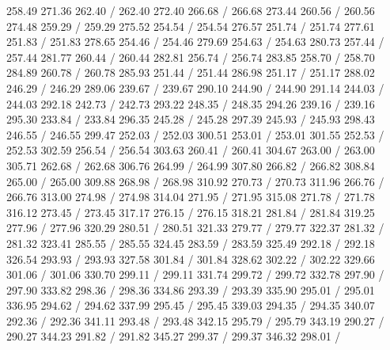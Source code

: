 { 258.49 271.36 262.40 /
 262.40 272.40 266.68 /
 266.68 273.44 260.56 /
 260.56 274.48 259.29 /
 259.29 275.52 254.54 /
 254.54 276.57 251.74 /
 251.74 277.61 251.83 /
 251.83 278.65 254.46 /
 254.46 279.69 254.63 /
 254.63 280.73 257.44 /
 257.44 281.77 260.44 /
 260.44 282.81 256.74 /
 256.74 283.85 258.70 /
 258.70 284.89 260.78 /
 260.78 285.93 251.44 /
 251.44 286.98 251.17 /
 251.17 288.02 246.29 /
 246.29 289.06 239.67 /
 239.67 290.10 244.90 /
 244.90 291.14 244.03 /
 244.03 292.18 242.73 /
 242.73 293.22 248.35 /
 248.35 294.26 239.16 /
 239.16 295.30 233.84 /
 233.84 296.35 245.28 /
 245.28 297.39 245.93 /
 245.93 298.43 246.55 /
 246.55 299.47 252.03 /
 252.03 300.51 253.01 /
 253.01 301.55 252.53 /
 252.53 302.59 256.54 /
 256.54 303.63 260.41 /
 260.41 304.67 263.00 /
 263.00 305.71 262.68 /
 262.68 306.76 264.99 /
 264.99 307.80 266.82 /
 266.82 308.84 265.00 /
 265.00 309.88 268.98 /
 268.98 310.92 270.73 /
 270.73 311.96 266.76 /
 266.76 313.00 274.98 /
 274.98 314.04 271.95 /
 271.95 315.08 271.78 /
 271.78 316.12 273.45 /
 273.45 317.17 276.15 /
 276.15 318.21 281.84 /
 281.84 319.25 277.96 /
 277.96 320.29 280.51 /
 280.51 321.33 279.77 /
 279.77 322.37 281.32 /
 281.32 323.41 285.55 /
 285.55 324.45 283.59 /
 283.59 325.49 292.18 /
 292.18 326.54 293.93 /
 293.93 327.58 301.84 /
 301.84 328.62 302.22 /
 302.22 329.66 301.06 /
 301.06 330.70 299.11 /
 299.11 331.74 299.72 /
 299.72 332.78 297.90 /
 297.90 333.82 298.36 /
 298.36 334.86 293.39 /
 293.39 335.90 295.01 /
 295.01 336.95 294.62 /
 294.62 337.99 295.45 /
 295.45 339.03 294.35 /
 294.35 340.07 292.36 /
 292.36 341.11 293.48 /
 293.48 342.15 295.79 /
 295.79 343.19 290.27 /
 290.27 344.23 291.82 /
 291.82 345.27 299.37 /
 299.37 346.32 298.01 /
}
